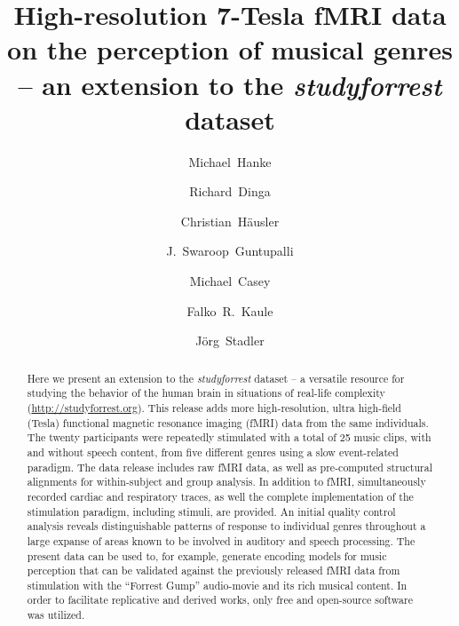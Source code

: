 \documentclass[10pt,a4paper,twocolumn]{article}
\begin{document}


\title{High-resolution 7-Tesla fMRI data on the perception of musical genres -- an extension to the \textit{studyforrest} dataset}

\author[1,2]{Michael~Hanke}
\author[1]{Richard~Dinga}
\author[1]{Christian~Häusler}
\author[3]{J.~Swaroop~Guntupalli}
\author[1,4]{Michael~Casey}
\author[1,5]{Falko~R.~Kaule}
\author[6]{J\"org~Stadler}

\maketitle
\thispagestyle{fancy}

\begin{abstract}

Here we present an extension to the \textit{studyforrest} dataset -- a
versatile resource for studying the behavior of the human brain in situations
of real-life complexity (\url{http://studyforrest.org}). This release adds more
high-resolution, ultra high-field (\unit[7]{Tesla}) functional magnetic resonance
imaging (fMRI) data from the same individuals. The twenty participants were
repeatedly stimulated with a total of 25 music clips, with and without speech
content, from five different genres using a slow event-related paradigm. The
data release includes raw fMRI data, as well as pre-computed structural
alignments for within-subject and group analysis.  In addition to fMRI,
simultaneously recorded cardiac and respiratory traces, as well the complete
implementation of the stimulation paradigm, including stimuli, are provided. An
initial quality control analysis reveals distinguishable patterns of response
to individual genres throughout a large expanse of areas known to be involved
in auditory and speech processing.  The present data can be used to, for
example, generate encoding models for music perception that can be validated
against the previously released fMRI data from stimulation with the ``Forrest
Gump'' audio-movie and its rich musical content.  In order to facilitate
replicative and derived works, only free and open-source software was utilized.

\end{abstract}
\end{document}
